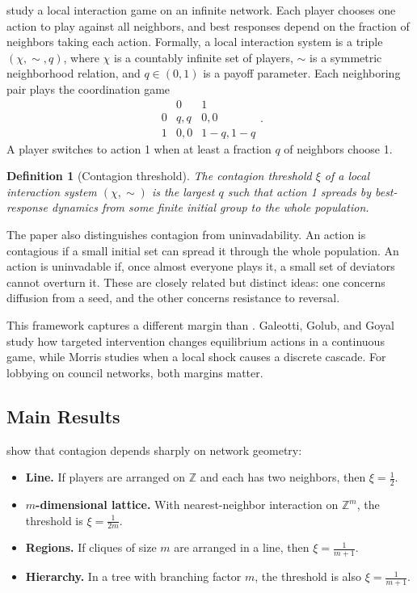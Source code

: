 \documentclass[11pt,letterpaper]{article}
\newtheorem{definition}{Definition}
\begin{document}
\citet{morris2000} study a local interaction game on an infinite network. Each player chooses one action to play against all neighbors, and best responses depend on the fraction of neighbors taking each action. Formally, a local interaction system is a triple $(\chi,\sim,q)$, where $\chi$ is a countably infinite set of players, $\sim$ is a symmetric neighborhood relation, and $q \in (0,1)$ is a payoff parameter. Each neighboring pair plays the coordination game
\begin{equation}
\begin{array}{c|cc}
 & 0 & 1 \\
\hline
0 & q, q & 0, 0 \\
1 & 0, 0 & 1-q, 1-q
\end{array}.
\label{eq:morris-game}
\end{equation}
A player switches to action 1 when at least a fraction $q$ of neighbors choose 1.

\begin{definition}[Contagion threshold]
The \textit{contagion threshold} $\xi$ of a local interaction system $(\chi,\sim)$ is the largest $q$ such that action 1 spreads by best-response dynamics from some finite initial group to the whole population.
\end{definition}

The paper also distinguishes contagion from uninvadability. An action is contagious if a small initial set can spread it through the whole population. An action is uninvadable if, once almost everyone plays it, a small set of deviators cannot overturn it. These are closely related but distinct ideas: one concerns diffusion from a seed, and the other concerns resistance to reversal.

This framework captures a different margin than \citet{galeotti2020}. Galeotti, Golub, and Goyal study how targeted intervention changes equilibrium actions in a continuous game, while Morris studies when a local shock causes a discrete cascade. For lobbying on council networks, both margins matter.

\subsection{Main Results}

\citet{morris2000} show that contagion depends sharply on network geometry:

\begin{itemize}
    \item \textbf{Line.} If players are arranged on $\mathbb{Z}$ and each has two neighbors, then $\xi = \frac{1}{2}$.
    \item \textbf{$m$-dimensional lattice.} With nearest-neighbor interaction on $\mathbb{Z}^m$, the threshold is $\xi = \frac{1}{2m}$.
    \item \textbf{Regions.} If cliques of size $m$ are arranged in a line, then $\xi = \frac{1}{m+1}$.
    \item \textbf{Hierarchy.} In a tree with branching factor $m$, the threshold is also $\xi = \frac{1}{m+1}$.
\end{itemize}
\end{document}
